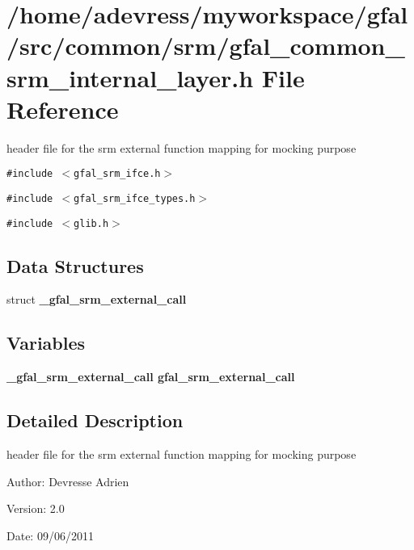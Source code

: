 \section{/home/adevress/myworkspace/gfal/src/common/srm/gfal\_\-common\_\-srm\_\-internal\_\-layer.h File Reference}
\label{gfal__common__srm__internal__layer_8h}
header file for the srm external function mapping for mocking purpose 

{\tt \#include $<$gfal\_\-srm\_\-ifce.h$>$}\par
{\tt \#include $<$gfal\_\-srm\_\-ifce\_\-types.h$>$}\par
{\tt \#include $<$glib.h$>$}\par
\subsection*{Data Structures}
\begin{CompactItemize}
\item 
struct \bf{\_\-gfal\_\-srm\_\-external\_\-call}
\end{CompactItemize}
\subsection*{Variables}
\begin{CompactItemize}
\item 
\bf{\_\-gfal\_\-srm\_\-external\_\-call} \textbf{gfal\_\-srm\_\-external\_\-call}\label{gfal__common__srm__internal__layer_8h_67b12c7342043451fc5ce31b1a3d74fb}

\end{CompactItemize}


\subsection{Detailed Description}
header file for the srm external function mapping for mocking purpose 

\begin{Desc}
\item[Author:]Devresse Adrien \end{Desc}
\begin{Desc}
\item[Version:]2.0 \end{Desc}
\begin{Desc}
\item[Date:]09/06/2011 \end{Desc}
